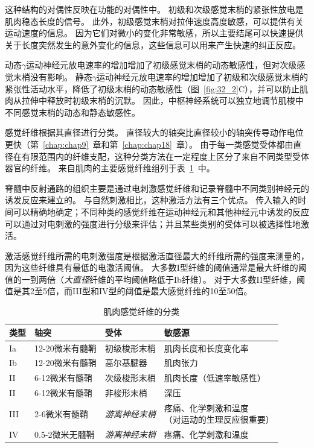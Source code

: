 \begin{proposition}[肌梭]
	\quad \quad 这种结构的对偶性反映在功能的对偶性中。
	初级和次级感觉末梢的紧张性放电是肌肉稳态长度的信号。
	此外，初级感觉末梢对拉伸速度高度敏感，可以提供有关运动速度的信息。
	因为它们对微小的变化非常敏感，所以主要结尾可以快速提供关于长度突然发生的意外变化的信息，这些信息可以用来产生快速的纠正反应。
	
	\quad \quad 动态$ \gamma $运动神经元放电速率的增加增加了初级感觉末梢的动态敏感性，但对次级感觉末梢没有影响。
	静态$ \gamma $运动神经元放电速率的增加增加了初级和次级感觉末梢的紧张性活动水平，降低了初级末梢的动态敏感性（图~\ref{fig:32_2}C），并可以防止肌肉从拉伸中释放时初级末梢的沉默。
	因此，中枢神经系统可以独立地调节肌梭中不同感觉末梢的动态和静态敏感性。
	
\end{proposition}


\begin{proposition}[肌肉感觉纤维的分类] \label{box:32_2}
	
	\quad \quad 感觉纤维根据其直径进行分类。
	直径较大的轴突比直径较小的轴突传导动作电位更快（第~\ref{chap:chap9}~章和第~\ref{chap:chap18}~章）。
	由于每一类感觉受体都由直径在有限范围内的纤维支配，这种分类方法在一定程度上区分了来自不同类型受体器官的纤维。
	来自肌肉的主要感觉纤维组列于表~\ref{tab:32_1}~中。
	
	\quad \quad 脊髓中反射通路的组织主要是通过电刺激感觉纤维和记录脊髓中不同类别神经元的诱发反应来建立的。
	与自然刺激相比，这种激活方法有三个优点。
	传入输入的时间可以精确地确定；不同种类的感觉纤维在运动神经元和其他神经元中诱发的反应可以通过对电刺激的强度进行分级来评估；并且某些类别的受体可以被选择性地激活。
	
	\quad \quad 激活感觉纤维所需的电刺激强度是根据激活直径最大的纤维所需的强度来测量的，因为这些纤维具有最低的电激活阈值。
	大多数I型纤维的阈值通常是最大纤维的阈值的一到两倍（\textit{大直径}纤维的平均阈值略低于Ib纤维）。
	对于大多数II型纤维，阈值是其2至5倍，而III型和IV型的阈值是最大感觉纤维的10至50倍。
	
\end{proposition}


\begin{table}[htbp]
	\caption{肌肉感觉纤维的分类} \label{tab:32_1} \centering
	\begin{tabular}{llll}
		\toprule
		类型 & 轴突 & 受体 & 敏感源 \\
		\midrule
		Ia & 12-20微米有髓鞘 & 初级梭形末梢 & 肌肉长度和长度变化率 \\
		Ib & 12-20微米有髓鞘 & 高尔基腱器 & 肌肉张力 \\
		II & 6-12微米有髓鞘 & 次级梭形末梢 & 肌肉长度（低速率敏感性） \\
		II & 6-12微米有髓鞘 & 非梭形末梢 & 深压 \\
		III & 2-6微米有髓鞘 & \textit{游离神经末梢} & \makecell[l]{疼痛、化学刺激和温度\\（对运动的生理反应很重要}） \\
		IV & 0.5-2微米无髓鞘 & \textit{游离神经末梢} & 疼痛、化学刺激和温度 \\
		\bottomrule
	\end{tabular}
\end{table}


